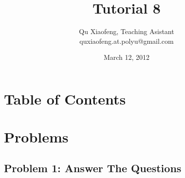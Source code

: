 \documentclass[
        ]{beamer}
\title{Tutorial 8}
\author[COMP435p]{Qu Xiaofeng\texorpdfstring{, Teaching Asistant\\\tiny{quxiaofeng.at.polyu@gmail.com}}{}}
\institute{COMP435p\\Biometrics Authentication}
\date{March 12, 2012}
\begin{document}
\newcommand{\inpdfu}[2]{\begin{figure}\centering\texttt{[image: im/lecture\_\#1]}\end{figure}}
\newcommand{\inpdfl}[2]{\begin{figure}\centering\texttt{[image: im/lecture\_\#1]}\end{figure}}
\newcommand{\inpdfc}[2]{\begin{figure}\centering\texttt{[image: im/lecture\_\#1]}\end{figure}}
\newcommand{\inpng}[1]{\begin{figure}\centering\texttt{[image: im/\#1]}\end{figure}}

\frame{\titlepage}

\section*{Table of Contents}

    \begin{frame}{\secname}
        \tableofcontents
    \end{frame}




\section{Problems}

    \subsection{Problem 1: Answer The Questions}
    
\end{document}
